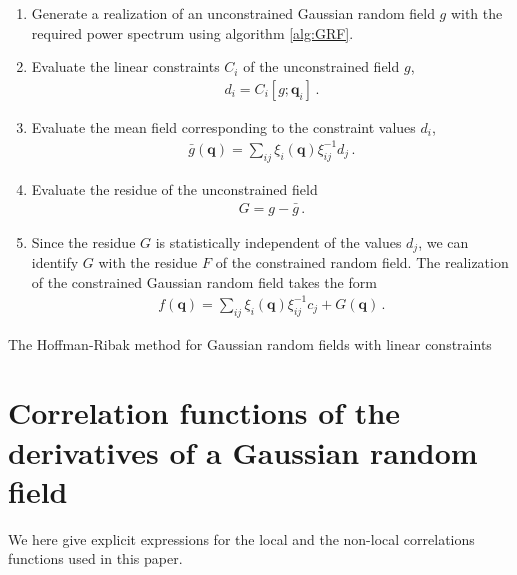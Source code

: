 \documentclass[a4paper, 11pt]{article}
\begin{document}
\begin{algorithm}[H]
\SetAlgoLined
\begin{enumerate}[itemsep=1ex, leftmargin=0cm, rightmargin=1cm]
\item Generate a realization of an unconstrained Gaussian random field $g$ with the required power spectrum using algorithm \ref{alg:GRF}.
\item Evaluate the linear constraints $C_i$ of the unconstrained field $g$,
\begin{align}
d_i = C_i[g;\bm{q}_i]\,.
\end{align} 
\item Evaluate the mean field corresponding to the constraint values $d_i$,
\begin{align}
\bar{g}(\bm{q}) = \sum_{ij}\xi_i(\bm{q}) \xi^{-1}_{ij} d_j\,.
\end{align}
\item Evaluate the residue of the unconstrained field 
\begin{align}
G=g - \bar{g}\,.
\end{align}
\item Since the residue $G$ is statistically independent of the values $d_j$, we can identify $G$ with the residue $F$ of the constrained random field. The realization of the constrained Gaussian random field takes the form
\begin{align}
f(\bm{q}) = \sum_{ij}\xi_i(\bm{q}) \xi^{-1}_{ij} c_j + G(\bm{q})\,.
\end{align}
\end{enumerate}
 \caption{The Hoffman-Ribak method for Gaussian random fields with linear constraints}
 \label{alg:HoffmanRibak}
\end{algorithm}


\section{Correlation functions of the derivatives of a Gaussian random field}\label{ap:correlations}

We here give explicit expressions for the local and the non-local correlations functions used in this paper.

\end{document}
